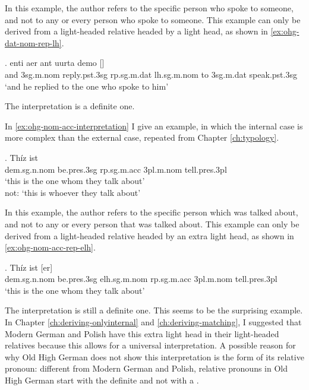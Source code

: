 In this example, the author refers to the specific person who spoke to someone, and not to any or every person who spoke to someone.
This example can only be derived from a light-headed relative headed by a light head, as shown in \ref{ex:ohg-dat-nom-rep-lh}.

\exg. enti aer {ant uurta} demo []  \\
and 3\ac{sg}.\ac{m}.\ac{nom} reply.\ac{pst}.3\ac{sg}\scsub{[dat]} \ac{rp}.\ac{sg}.\ac{m}.\ac{dat} \ac{lh}.\ac{sg}.\ac{m}.\ac{nom} {to 3\ac{sg}.\ac{m}.\ac{dat}} speak.\ac{pst}.3\ac{sg}\scsub{[nom]}\\
`and he replied to the one who spoke to him'
\label{ex:ohg-dat-nom-rep-lh}

The interpretation is a definite one.

In \ref{ex:ohg-nom-acc-interpretation} I give an example, in which the internal case is more complex than the external case, repeated from Chapter \ref{ch:typology}.

\exg. Thíz ist   \\
\ac{dem}.\ac{sg}.\ac{n}.\ac{nom} be.\ac{pres}.3\ac{sg}\scsub{[nom]} \ac{rp}.\ac{sg}.\ac{m}.\ac{acc}
3\ac{pl}.\ac{m}.\ac{nom} tell.\ac{pres}.3\ac{pl}\scsub{[acc]}\\
`this is the one whom they talk about'\\
not: `this is whoever they talk about' \label{ex:ohg-nom-acc-interpretation}

In this example, the author refers to the specific person which was talked about, and not to any or every person that was talked about.
This example can only be derived from a light-headed relative headed by an extra light head, as shown in \ref{ex:ohg-nom-acc-rep-elh}.

\exg. Thíz ist [er]   \\
\ac{dem}.\ac{sg}.\ac{n}.\ac{nom} be.\ac{pres}.3\ac{sg}\scsub{[nom]} \ac{elh}.\ac{sg}.\ac{m}.\ac{nom} \ac{rp}.\ac{sg}.\ac{m}.\ac{acc}
3\ac{pl}.\ac{m}.\ac{nom} tell.\ac{pres}.3\ac{pl}\scsub{[acc]}\\
`this is the one whom they talk about' \label{ex:ohg-nom-acc-rep-elh}

The interpretation is still a definite one. This seems to be the surprising example. In Chapter \ref{ch:deriving-onlyinternal} and \ref{ch:deriving-matching}, I suggested that Modern German and Polish have this extra light head in their light-headed relatives because this allows for a universal interpretation. A possible reason for why Old High German does not show this interpretation is the form of its relative pronoun: different from Modern German and Polish, relative pronouns in Old High German start with the definite  and not with a .

